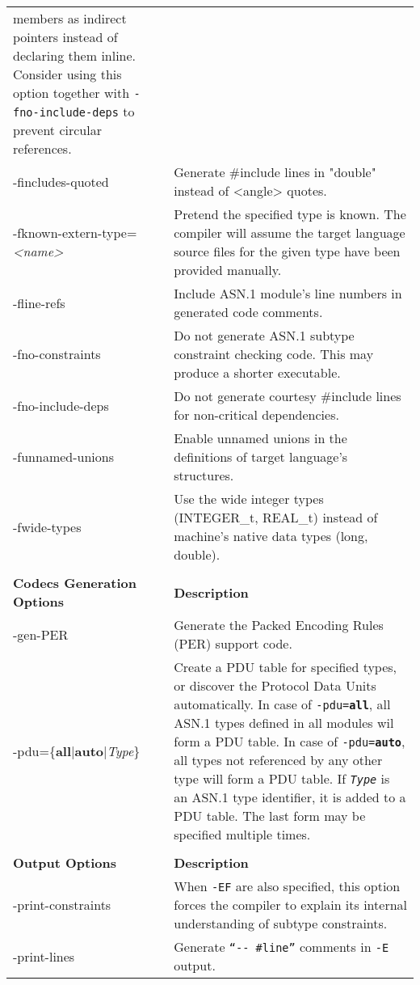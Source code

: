 \documentclass[english,oneside,12pt]{book}
\begin{document}
\begin{longtable}{lp{4in}}
{members as indirect pointers instead of declaring them inline. Consider
using this option together with \texttt{-fno-include-deps}
to prevent circular references.}\\
{\ttfamily -fincludes-quoted} & {\small Generate \#include lines in "double" instead of <angle> quotes.}\\
{\ttfamily -fknown-extern-type=\emph{<name>}} & {\small Pretend the specified type is known. The compiler will assume
the target language source files for the given type have been provided
manually. }\\
{\ttfamily -fline-refs} & {\small Include ASN.1 module's line numbers in generated code comments.}\\
{\ttfamily -fno-constraints} & {\small Do not generate ASN.1 subtype constraint checking code. This
may produce a shorter executable.}\\
{\ttfamily -fno-include-deps} & {\small Do not generate courtesy \#include lines for non-critical dependencies.}\\
{\ttfamily -funnamed-unions} & {\small Enable  unnamed  unions in the definitions of target language's structures.}\\
{\ttfamily -fwide-types} & {\small Use the wide integer types (INTEGER\_t, REAL\_t) instead of machine's native data types (long, double). }\\\\
\textbf{Codecs Generation Options} & \textbf{Description}\\
\midrule
{\ttfamily -gen-PER} & {\small Generate the Packed Encoding Rules (PER) support code.}\\
{\ttfamily -pdu=\{\textbf{all}|\textbf{auto}|\emph{Type}\}} & {\small Create a PDU table for specified types, or discover the Protocol Data Units automatically.
In case of \texttt{-pdu=\textbf{all}}, all ASN.1 types defined in all modules wil form a PDU table. In case of \texttt{-pdu=\textbf{auto}}, all types not referenced by any other type will form a PDU table. If \texttt{\emph{Type}} is an ASN.1 type identifier, it is added to a PDU table. The last form may be specified multiple times.}\\ \\
\textbf{Output Options} & \textbf{Description}\\
\midrule
{\ttfamily -print-constraints} & {\small When \texttt{-EF} are also specified, this option forces the compiler
to explain its internal understanding of subtype constraints.}\\
{\ttfamily -print-lines} & {\small Generate \texttt{``-{}- \#line''} comments
in \texttt{-E} output.}\\
\end{longtable}
\renewcommand{\arraystretch}{1}
\end{document}
